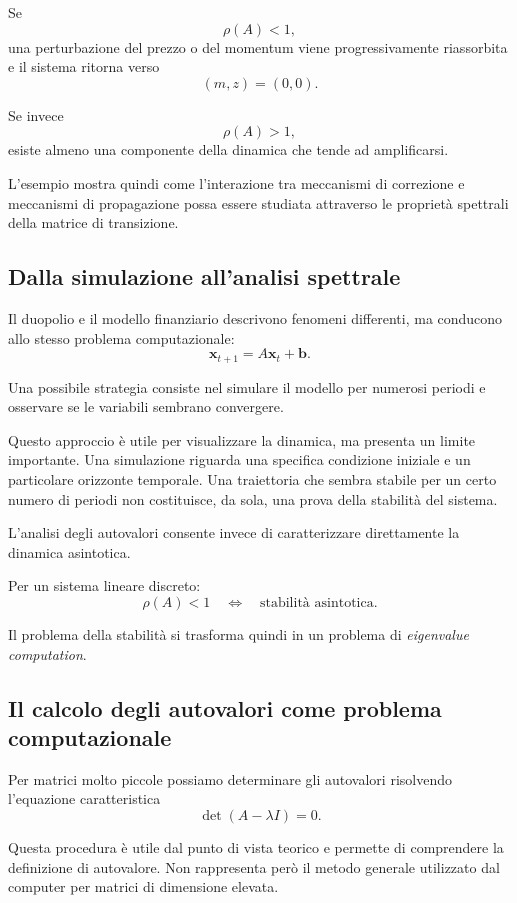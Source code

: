 \documentclass{book}
\begin{document}
Se
\[
\rho(A)<1,
\]
una perturbazione del prezzo o del momentum viene progressivamente
riassorbita e il sistema ritorna verso
\[
(m,z)=(0,0).
\]

Se invece
\[
\rho(A)>1,
\]
esiste almeno una componente della dinamica che tende ad amplificarsi.

L'esempio mostra quindi come l'interazione tra meccanismi di correzione e
meccanismi di propagazione possa essere studiata attraverso le proprietà
spettrali della matrice di transizione.


\subsection{Dalla simulazione all'analisi spettrale}

Il duopolio e il modello finanziario descrivono fenomeni differenti, ma
conducono allo stesso problema computazionale:
\[
\mathbf{x}_{t+1}
=
A\mathbf{x}_t+\mathbf{b}.
\]

Una possibile strategia consiste nel simulare il modello per numerosi
periodi e osservare se le variabili sembrano convergere.

Questo approccio è utile per visualizzare la dinamica, ma presenta un
limite importante. Una simulazione riguarda una specifica condizione
iniziale e un particolare orizzonte temporale. Una traiettoria che sembra
stabile per un certo numero di periodi non costituisce, da sola, una prova
della stabilità del sistema.

L'analisi degli autovalori consente invece di caratterizzare direttamente
la dinamica asintotica.

Per un sistema lineare discreto:
\[
\boxed{
\rho(A)<1
\quad\Longleftrightarrow\quad
\text{stabilità asintotica}
}.
\]

Il problema della stabilità si trasforma quindi in un problema di
\emph{eigenvalue computation}.


\subsection{Il calcolo degli autovalori come problema computazionale}

Per matrici molto piccole possiamo determinare gli autovalori risolvendo
l'equazione caratteristica
\[
\det(A-\lambda I)=0.
\]

Questa procedura è utile dal punto di vista teorico e permette di
comprendere la definizione di autovalore. Non rappresenta però il metodo
generale utilizzato dal computer per matrici di dimensione elevata.
\end{document}
